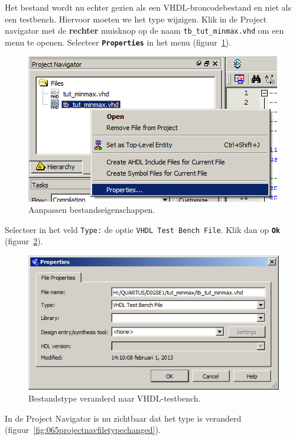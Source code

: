 \documentclass[a4paper,12pt,fleqn,twoside]{book}
\def\tutpicscale{0.455}
\newcommand{\menu}[1]{\texttt{\textbf{#1}}}
\newcommand{\naam}[1]{\texttt{#1}}
\begin{document}
Het bestand wordt nu echter gezien als een VHDL-broncodebestand en niet als
een testbench. Hiervoor moeten we het type wijzigen. Klik in de Project
navigator met de \textbf{rechter} muisknop op de naam
\naam{tb\_tut\_minmax.vhd} om een menu te openen. Selecteer \menu{Properties}
in het menu (figuur~\ref{fig:063changeproperties}).
 
\begin{figure}[H]
\centering
\includegraphics[scale=\tutpicscale]{063changeproperties.png}
\caption{Aanpassen bestandseigenschappen.}
\label{fig:063changeproperties}
\end{figure}

Selecteer in het veld \naam{Type:} de optie \naam{VHDL Test Bench File}. Klik dan op \menu{Ok}
(figuur~\ref{fig:064changedtotestbench}).
 
\begin{figure}[H]
\centering
\includegraphics[scale=\tutpicscale]{064changedtotestbench.png}
\caption{Bestandstype veranderd naar VHDL-testbench.}
\label{fig:064changedtotestbench}
\end{figure}

In de Project Navigator is nu zichtbaar dat het type is veranderd (figuur~\ref{fig:065projectnavfiletypechanged}).
 
\end{document}
